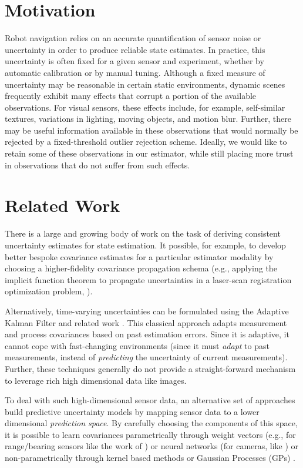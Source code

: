 \section{Motivation}

Robot navigation relies on an accurate quantification of sensor noise or uncertainty in order to produce reliable state estimates.
In practice, this uncertainty is often fixed for a given sensor and experiment, whether by automatic calibration or by manual tuning.
Although a fixed measure of uncertainty may be reasonable in certain static environments, dynamic scenes frequently exhibit many effects that corrupt a portion of the available observations.
For visual sensors, these effects include, for example, self-similar textures, variations in lighting, moving objects, and motion blur. 
Further, there may be useful information available in these observations that would normally be rejected by a fixed-threshold outlier rejection scheme. 
Ideally, we would like to retain some of these observations in our estimator, while still placing more trust in observations that do not suffer from such effects.


\section{Related Work}


There is a large and growing body of work on the task of deriving consistent uncertainty estimates for state estimation.  It possible, for example, to develop better bespoke covariance estimates for a particular estimator modality by choosing a higher-fidelity covariance propagation schema (e.g., applying the implicit function theorem to propagate uncertainties in a laser-scan registration optimization problem, \cite{censi2007accurate}).  

Alternatively, time-varying uncertainties can be formulated using the Adaptive Kalman Filter and related work \citep{gustafsson2000adaptive}. This classical approach adapts measurement and process covariances based on past estimation errors. Since it is adaptive, it cannot cope with fast-changing environments (since it must \textit{adapt} to past measurements, instead of \textit{predicting} the uncertainty of current measurements). Further, these techniques generally do not provide a straight-forward mechanism to leverage rich high dimensional data like images. 

To deal with such high-dimensional sensor data, an alternative set of approaches build predictive uncertainty models by mapping sensor data to a lower dimensional \textit{prediction space}. By carefully choosing the components of this space, it is possible to learn covariances parametrically through weight vectors (e.g., for range/bearing sensors like the work of \cite{Hu2015-uw}) or neural networks (for cameras, like \cite{liu2018deep}) or non-parametrically  through kernel based methods \citep{VegaBrown:ew, VegaBrown:2013fv} or Gaussian Processes (GPs) \citep{ko2009gp}. 

